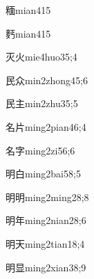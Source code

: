 \begin{verbete}{糆}{mian4}{15}
\end{verbete}

\begin{verbete}{麫}{mian4}{15}
\end{verbete}

\begin{verbete}{灭火}{mie4huo3}{5;4}
\end{verbete}

\begin{verbete}{民众}{min2zhong4}{5;6}
\end{verbete}

\begin{verbete}{民主}{min2zhu3}{5;5}
\end{verbete}

\begin{verbete}{名片}{ming2pian4}{6;4}
\end{verbete}

\begin{verbete}{名字}{ming2zi5}{6;6}
\end{verbete}

\begin{verbete}{明白}{ming2bai5}{8;5}
\end{verbete}

\begin{verbete}{明明}{ming2ming2}{8;8}
\end{verbete}

\begin{verbete}{明年}{ming2nian2}{8;6}
\end{verbete}

\begin{verbete}{明天}{ming2tian1}{8;4}
\end{verbete}

\begin{verbete}{明显}{ming2xian3}{8;9}
\end{verbete}

